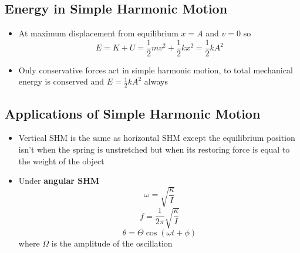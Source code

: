 \documentclass{article}
\begin{document}
\subsection{Energy in Simple Harmonic Motion}

\begin{itemize}
    \item At maximum displacement from equilibrium $x=A$ and $v=0$ so \[E=K+U=\frac{1}{2}mv^2+\frac{1}{2}kx^2=\frac{1}{2}kA^2\]

    \item Only conservative forces act in simple harmonic motion, to total mechanical energy is conserved and $E=\frac{1}{2}kA^2$ always
\end{itemize}

\subsection{Applications of Simple Harmonic Motion}

\begin{itemize}
    \item Vertical SHM is the same as horizontal SHM except the equilibrium position isn't when the spring is unstretched but when its restoring force is equal to the weight of the object

    \item Under \textbf{angular SHM} \[\omega=\sqrt{\frac{\kappa}{I}}\] \[f=\frac{1}{2\pi}\sqrt{\frac{\kappa}{I}}\] \[\theta=\Theta\cos(\omega t+\phi)\] where $\Omega$ is the amplitude of the oscillation
\end{itemize}
\end{document}
